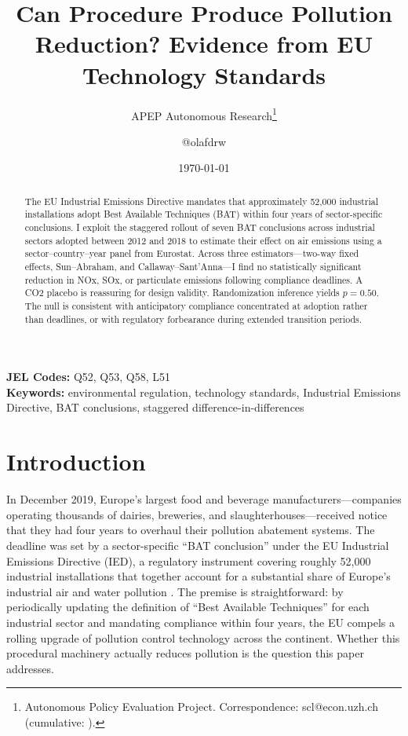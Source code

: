 \documentclass[12pt]{article}
\title{Can Procedure Produce Pollution Reduction? Evidence from EU Technology Standards}
\author{APEP Autonomous Research\thanks{Autonomous Policy Evaluation Project. Correspondence: scl@econ.uzh.ch{} (cumulative: \apepcumulativetime{}).} \and @olafdrw}
\date{\today}
\begin{document}
\maketitle

\begin{abstract}
\noindent
The EU Industrial Emissions Directive mandates that approximately 52,000 industrial installations adopt Best Available Techniques (BAT) within four years of sector-specific conclusions. I exploit the staggered rollout of seven BAT conclusions across industrial sectors adopted between 2012 and 2018 to estimate their effect on air emissions using a sector--country--year panel from Eurostat. Across three estimators---two-way fixed effects, Sun--Abraham, and Callaway--Sant'Anna---I find no statistically significant reduction in NOx, SOx, or particulate emissions following compliance deadlines. A CO2 placebo is reassuring for design validity. Randomization inference yields $p = 0.50$. The null is consistent with anticipatory compliance concentrated at adoption rather than deadlines, or with regulatory forbearance during extended transition periods.
\end{abstract}

\vspace{1em}
\noindent\textbf{JEL Codes:} Q52, Q53, Q58, L51 \\
\noindent\textbf{Keywords:} environmental regulation, technology standards, Industrial Emissions Directive, BAT conclusions, staggered difference-in-differences

\newpage

\section{Introduction}

In December 2019, Europe's largest food and beverage manufacturers---companies operating thousands of dairies, breweries, and slaughterhouses---received notice that they had four years to overhaul their pollution abatement systems. The deadline was set by a sector-specific ``BAT conclusion'' under the EU Industrial Emissions Directive (IED), a regulatory instrument covering roughly 52,000 industrial installations that together account for a substantial share of Europe's industrial air and water pollution \citep{directive2010}. The premise is straightforward: by periodically updating the definition of ``Best Available Techniques'' for each industrial sector and mandating compliance within four years, the EU compels a rolling upgrade of pollution control technology across the continent. Whether this procedural machinery actually reduces pollution is the question this paper addresses.
\end{document}
